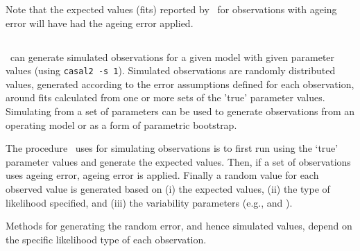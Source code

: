 {{{{Note that the expected values (fits) reported by \CNAME\ for observations with ageing error will have had the ageing error applied. 

\subsection{\label{sec:simulation-observations}}

\CNAME\ can generate simulated observations for a given model with given parameter values (using \texttt{casal2 -s 1}). Simulated observations are randomly distributed values, generated according to the error assumptions defined for each observation, around fits calculated from one or more sets of the 'true' parameter values. Simulating from a set of parameters can be used to generate observations from an operating model or as a form of parametric bootstrap. 

The procedure \CNAME\ uses for simulating observations is to first run using the `true' parameter values and generate the expected values. Then, if a set of observations uses ageing error, ageing error is applied. Finally a random value for each observed value is generated based on (i) the expected values, (ii) the type of likelihood specified, and (iii) the variability parameters (e.g.,  and ). 

Methods for generating the random error, and hence simulated values, depend on the specific likelihood type of each observation. 

}}}}
